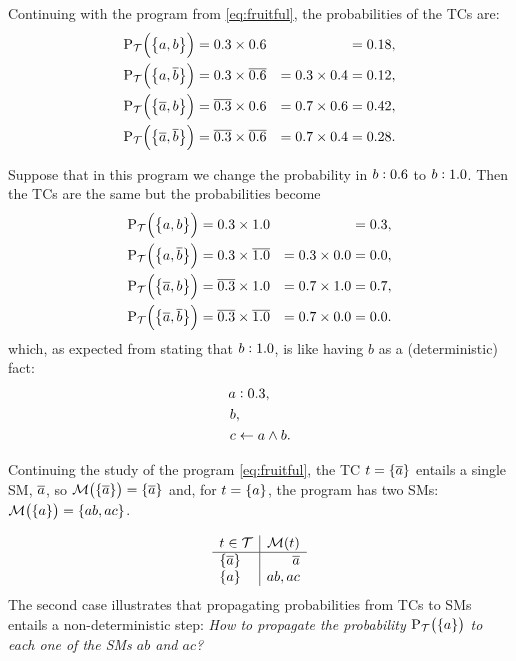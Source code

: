 \documentclass{article}
\begin{document}
Continuing with the program from \cref{eq:fruitful}, the
probabilities of the \aclp{TC} are:
\begin{equation*}
	\begin{aligned}
		\prT\at{\set[1]{a, b}}           & = 0.3 \times 0.6           &                  & = 0.18, \\
		\prT\at{\set[1]{a, \co{b}}}      & = 0.3 \times \co{0.6}      & = 0.3 \times 0.4 & = 0.12, \\
		\prT\at{\set[1]{\co{a}, b}}      & = \co{0.3} \times 0.6      & = 0.7 \times 0.6 & = 0.42, \\
		\prT\at{\set[1]{\co{a}, \co{b}}} & = \co{0.3} \times \co{0.6} & = 0.7 \times 0.4 & = 0.28.
	\end{aligned}
\end{equation*}

Suppose that in this program we change the probability in
\(b:0.6\) to \(b:1.0\).  Then the \aclp{TC}
are the same but the probabilities become
\begin{equation*}
	\begin{aligned}
		\prT\at{\set[1]{a, b}}           & = 0.3 \times 1.0           &                  & = 0.3, \\
		\prT\at{\set[1]{a, \co{b}}}      & = 0.3 \times \co{1.0}      & = 0.3 \times 0.0 & = 0.0, \\
		\prT\at{\set[1]{\co{a}, b}}      & = \co{0.3} \times 1.0      & = 0.7 \times 1.0 & = 0.7, \\
		\prT\at{\set[1]{\co{a}, \co{b}}} & = \co{0.3} \times \co{1.0} & = 0.7 \times 0.0 & = 0.0.
	\end{aligned}
\end{equation*}
which, as expected from stating that \(b:1.0\), is like
having \(b\) as a (deterministic) fact:
\begin{equation*}
	\begin{split}
		a&:0.3, \\
		b &, \\
		c & \leftarrow a \wedge b.
	\end{split}
\end{equation*}

Continuing the study of the program \cref{eq:fruitful}, the \acl{TC} \(t = \set{\ensuremath{\overline{a}}}\)
entails a single \acl{SM}, \(\overline{a}\), so
\( \MODELset\at{\set{\co{a}}} = \set{\co{a}} \) and, for
\(t = \set{a}\), the program has two \aclp{SM}:
\( \MODELset\at{\set{a}} = \set{ab, ac}\).

\begin{equation*}
	\begin{array}{l|r}
		t \in \TCHOICEset   & \MODELset\at{t} \\
		\hline \set{\co{a}} & \co{a}          \\
		\set{a}             & ab, ac
	\end{array}
\end{equation*}
The second case illustrates that propagating probabilities from
\aclp{TC} to \aclp{SM} entails a non-deterministic step: \textit{How
	to propagate the probability \(\prT\at{\set{a}}\) to each one of
	the \aclp{SM} \(ab\) and \(ac\)?}
\end{document}
